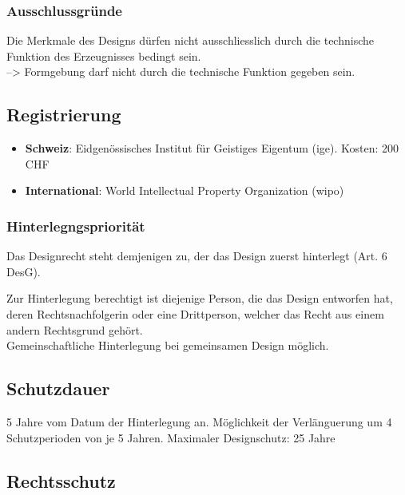 \hypertarget{ausschlussgruxfcnde}{%
\subsubsection{Ausschlussgründe}\label{ausschlussgruxfcnde}}

Die Merkmale des Designs dürfen nicht ausschliesslich durch die
technische Funktion des Erzeugnisses bedingt sein.\\
--\textgreater{} Formgebung darf nicht durch die technische Funktion
gegeben sein.

\hypertarget{registrierung}{%
\subsection{Registrierung}\label{registrierung}}

\begin{itemize}
\tightlist
\item
  \textbf{Schweiz}: Eidgenössisches Institut für Geistiges Eigentum
  (ige). Kosten: 200 CHF
\item
  \textbf{International}: World Intellectual Property Organization
  (wipo)
\end{itemize}

\hypertarget{hinterlegngspriorituxe4t}{%
\subsubsection{Hinterlegngspriorität}\label{hinterlegngspriorituxe4t}}

Das Designrecht steht demjenigen zu, der das Design zuerst hinterlegt
(Art. 6 DesG).

Zur Hinterlegung berechtigt ist diejenige Person, die das Design
entworfen hat, deren Rechtsnachfolgerin oder eine Drittperson, welcher
das Recht aus einem andern Rechtsgrund gehört.\\
Gemeinschaftliche Hinterlegung bei gemeinsamen Design möglich.

\hypertarget{schutzdauer}{%
\subsection{Schutzdauer}\label{schutzdauer}}

5 Jahre vom Datum der Hinterlegung an. Möglichkeit der Verlänguerung um
4 Schutzperioden von je 5 Jahren. Maximaler Designschutz: 25 Jahre

\hypertarget{rechtsschutz}{%
\subsection{Rechtsschutz}\label{rechtsschutz}}

